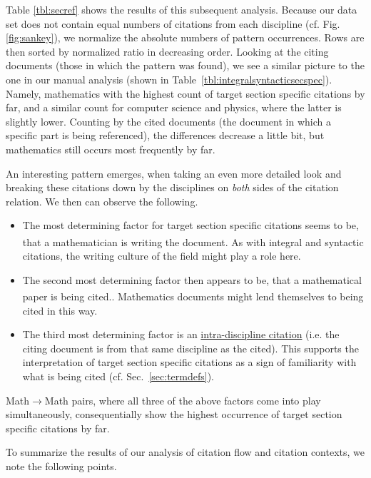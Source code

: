 Table \ref{tbl:secref} shows the results of this subsequent analysis. Because our data set does not contain equal numbers of citations from each discipline (cf. Fig. \ref{fig:sankey}), we normalize the absolute numbers of pattern occurrences. Rows are then sorted by normalized ratio in decreasing order. Looking at the citing documents (those in which the pattern was found), we see a similar picture to the one in our manual analysis (shown in Table~\ref{tbl:integralsyntacticsecspec}). Namely, mathematics with the highest count of target section specific citations by far, and a similar count for computer science and physics, where the latter is slightly lower. Counting by the cited documents (the document in which a specific part is being referenced), the differences decrease a little bit, but mathematics still occurs most frequently by far.

An interesting pattern emerges, when taking an even more detailed look and breaking these citations down by the disciplines on \emph{both} sides of the citation relation. We then can observe the following.
\begin{itemize}
 \item The most determining factor for target section specific citations seems to be, that a mathematician is writing the document.\textsuperscript{\textdagger} As with integral and syntactic citations, the writing culture of the field might play a role here.
 \item The second most determining factor then appears to be, that a mathematical paper is being cited.\textsuperscript{\textdaggerdbl}. Mathematics documents might lend themselves to being cited in this way.
 \item The third most determining factor is an \underline{intra-discipline citation} (i.e. the citing document is from that same discipline as the cited). This supports the interpretation of target section specific citations as a sign of familiarity with what is being cited (cf. Sec.~\ref{sec:termdefs}).
\end{itemize}

Math$\rightarrow$Math pairs, where all three of the above factors come into play simultaneously, consequentially show the highest occurrence of target section specific citations by far.

To summarize the results of our analysis of citation flow and citation contexts, we note the following points.

